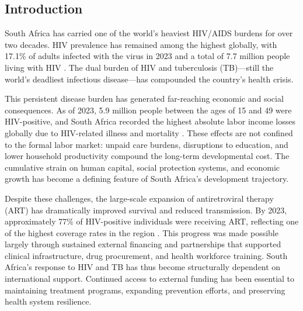 \documentclass[letterpaper,12pt]{article}
\theoremstyle{definition}
\begin{document}
\begin{spacing}{1.5}


\newpage

\section{Introduction}\label{SecIntro}

South Africa has carried one of the world’s heaviest HIV/AIDS burdens for over two decades. HIV prevalence has remained among the highest globally, with 17.1\% of adults infected with the virus in 2023 and a total of 7.7 million people living with HIV \citep{UNAIDSData2024}. The dual burden of HIV and tuberculosis (TB)—still the world’s deadliest infectious disease—has compounded the country’s health crisis.

This persistent disease burden has generated far-reaching economic and social consequences. As of 2023, 5.9 million people between the ages of 15 and 49 were HIV-positive, and South Africa recorded the highest absolute labor income losses globally due to HIV-related illness and mortality \citep{ILO2018}. These effects are not confined to the formal labor market: unpaid care burdens, disruptions to education, and lower household productivity compound the long-term developmental cost. The cumulative strain on human capital, social protection systems, and economic growth has become a defining feature of South Africa’s development trajectory.

Despite these challenges, the large-scale expansion of antiretroviral therapy (ART) has dramatically improved survival and reduced transmission. By 2023, approximately 77\% of HIV-positive individuals were receiving ART, reflecting one of the highest coverage rates in the region \citep{UNAIDSData2024}. This progress was made possible largely through sustained external financing and partnerships that supported clinical infrastructure, drug procurement, and health workforce training. South Africa’s response to HIV and TB has thus become structurally dependent on international support. Continued access to external funding has been essential to maintaining treatment programs, expanding prevention efforts, and preserving health system resilience.


\end{spacing}
\end{document}
